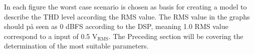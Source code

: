 In each figure the worst case scenario is chosen as basis for creating a model to describe the THD level according the RMS value. The RMS value in the graphs should på seen as 0 dBFS according to the DSP, meaning 1.0 RMS value correspond to a input of 0.5 $\text{V}_\text{RMS}$. The Preceding section will be covering the determination of the most suitable parameters. 










%
